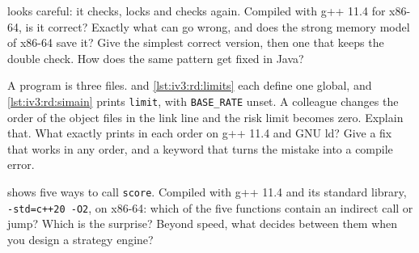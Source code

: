\begin{question}\label{iq:iv3:reading-debugging-and-software-design:32}
 looks careful: it checks, locks and checks again. Compiled with g++ 11.4 for x86-64, is it correct? Exactly what can go wrong, and does the strong memory model of x86-64 save it? Give the simplest correct version, then one that keeps the double check. How does the same pattern get fixed in Java?
\label{lst:iv3:rd:dcl}
\end{question}

\begin{question}\label{iq:iv3:reading-debugging-and-software-design:33}
A program is three files.  and \cref{lst:iv3:rd:limits} each define one global, and \cref{lst:iv3:rd:simain} prints \texttt{limit}, with \texttt{BASE\_RATE} unset. A colleague changes the order of the object files in the link line and the risk limit becomes zero. Explain that. What exactly prints in each order on g++ 11.4 and GNU ld? Give a fix that works in any order, and a keyword that turns the mistake into a compile error.
\label{lst:iv3:rd:rates}
\label{lst:iv3:rd:limits}
\label{lst:iv3:rd:simain}
\end{question}

\begin{question}\label{iq:iv3:reading-debugging-and-software-design:34}
 shows five ways to call \texttt{score}. Compiled with g++ 11.4 and its standard library, \texttt{-std=c++20 -O2}, on x86-64: which of the five functions contain an indirect call or jump? Which is the surprise? Beyond speed, what decides between them when you design a strategy engine?
\label{lst:iv3:rd:dispatch}
\end{question}

